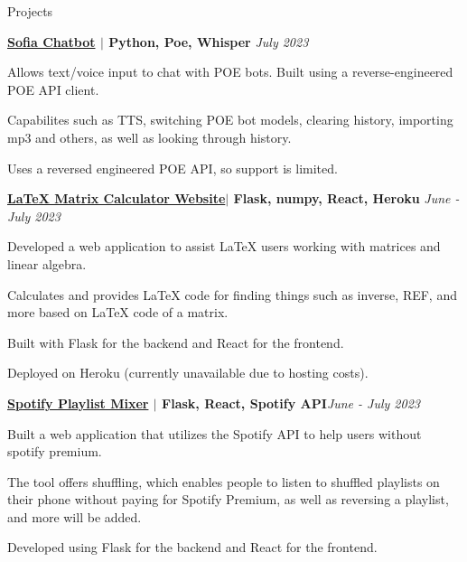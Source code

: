 \documentclass[
	11pt, %
]{resume} %
\begin{document}
\begin{rSection}{Projects}

	\begin{rSubsection}{}{}{\bf \href{https://github.com/maxinimus/sofia}{Sofia Chatbot} $\mid$ Python, Poe, Whisper }{\hfill \em July 2023}
		\item Allows text/voice input to chat with POE bots. Built using a reverse-engineered POE API client.
		\item Capabilites such as TTS, switching POE bot models, clearing history, importing mp3 and others, as well as looking through history.
		\item Uses a reversed engineered POE API, so support is limited.	
	\end{rSubsection}


	\begin{rSubsection}{}{}{\bf \href{https://github.com/maxinimus/LaTeX-Matrix-Calculator}{LaTeX Matrix Calculator Website}$\mid$ Flask, numpy, React, Heroku }{ \hfill \em June - July 2023}

		\item Developed a web application to assist LaTeX users working with matrices and linear algebra.
		\item Calculates and provides LaTeX code for finding things such as inverse, REF, and more based on LaTeX code of a matrix.
		\item Built with Flask for the backend and React for the frontend.
		\item Deployed on Heroku (currently unavailable due to hosting costs).
	\end{rSubsection}


	\begin{rSubsection}{}{}{\bf \href{https://github.com/maxinimus/music-mixer}{Spotify Playlist Mixer} $\mid$ Flask, React, Spotify API}{\hfill \em June - July 2023}
		\item Built a web application that utilizes the Spotify API to help users without spotify premium.
		\item The tool offers shuffling, which enables people to listen to shuffled playlists on their phone without paying for Spotify Premium, as well as reversing a playlist, and more will be added.
		\item Developed using Flask for the backend and React for the frontend.
	\end{rSubsection}

\end{rSection}
\end{document}
